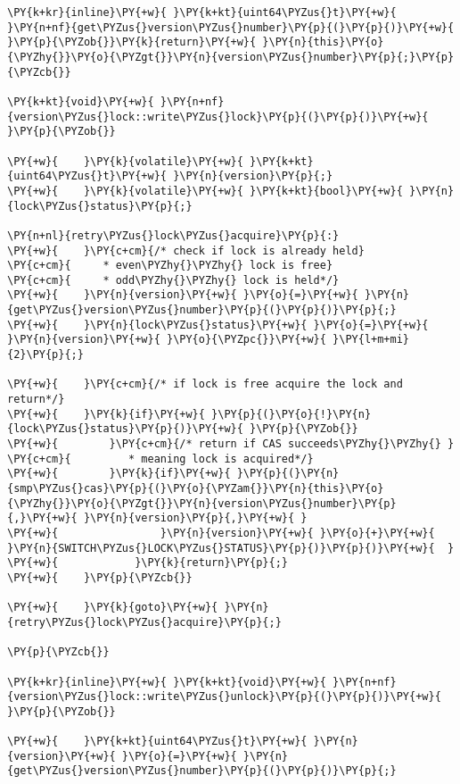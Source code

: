 \begin{Verbatim}[commandchars=\\\{\},codes={\catcode`\$=3\catcode`\^=7\catcode`\_=8\relax}]
\PY{k+kr}{inline}\PY{+w}{ }\PY{k+kt}{uint64\PYZus{}t}\PY{+w}{ }\PY{n+nf}{get\PYZus{}version\PYZus{}number}\PY{p}{(}\PY{p}{)}\PY{+w}{ }\PY{p}{\PYZob{}}\PY{k}{return}\PY{+w}{ }\PY{n}{this}\PY{o}{\PYZhy{}}\PY{o}{\PYZgt{}}\PY{n}{version\PYZus{}number}\PY{p}{;}\PY{p}{\PYZcb{}}

\PY{k+kt}{void}\PY{+w}{ }\PY{n+nf}{version\PYZus{}lock::write\PYZus{}lock}\PY{p}{(}\PY{p}{)}\PY{+w}{ }\PY{p}{\PYZob{}}

\PY{+w}{    }\PY{k}{volatile}\PY{+w}{ }\PY{k+kt}{uint64\PYZus{}t}\PY{+w}{ }\PY{n}{version}\PY{p}{;}
\PY{+w}{    }\PY{k}{volatile}\PY{+w}{ }\PY{k+kt}{bool}\PY{+w}{ }\PY{n}{lock\PYZus{}status}\PY{p}{;}

\PY{n+nl}{retry\PYZus{}lock\PYZus{}acquire}\PY{p}{:}
\PY{+w}{    }\PY{c+cm}{/* check if lock is already held}
\PY{c+cm}{     * even\PYZhy{}\PYZhy{} lock is free}
\PY{c+cm}{     * odd\PYZhy{}\PYZhy{} lock is held*/}
\PY{+w}{    }\PY{n}{version}\PY{+w}{ }\PY{o}{=}\PY{+w}{ }\PY{n}{get\PYZus{}version\PYZus{}number}\PY{p}{(}\PY{p}{)}\PY{p}{;}
\PY{+w}{    }\PY{n}{lock\PYZus{}status}\PY{+w}{ }\PY{o}{=}\PY{+w}{ }\PY{n}{version}\PY{+w}{ }\PY{o}{\PYZpc{}}\PY{+w}{ }\PY{l+m+mi}{2}\PY{p}{;}

\PY{+w}{    }\PY{c+cm}{/* if lock is free acquire the lock and return*/}
\PY{+w}{    }\PY{k}{if}\PY{+w}{ }\PY{p}{(}\PY{o}{!}\PY{n}{lock\PYZus{}status}\PY{p}{)}\PY{+w}{ }\PY{p}{\PYZob{}}
\PY{+w}{        }\PY{c+cm}{/* return if CAS succeeds\PYZhy{}\PYZhy{} }
\PY{c+cm}{         * meaning lock is acquired*/}
\PY{+w}{        }\PY{k}{if}\PY{+w}{ }\PY{p}{(}\PY{n}{smp\PYZus{}cas}\PY{p}{(}\PY{o}{\PYZam{}}\PY{n}{this}\PY{o}{\PYZhy{}}\PY{o}{\PYZgt{}}\PY{n}{version\PYZus{}number}\PY{p}{,}\PY{+w}{ }\PY{n}{version}\PY{p}{,}\PY{+w}{ }
\PY{+w}{                }\PY{n}{version}\PY{+w}{ }\PY{o}{+}\PY{+w}{ }\PY{n}{SWITCH\PYZus{}LOCK\PYZus{}STATUS}\PY{p}{)}\PY{p}{)}\PY{+w}{  }
\PY{+w}{            }\PY{k}{return}\PY{p}{;}
\PY{+w}{    }\PY{p}{\PYZcb{}}

\PY{+w}{    }\PY{k}{goto}\PY{+w}{ }\PY{n}{retry\PYZus{}lock\PYZus{}acquire}\PY{p}{;}

\PY{p}{\PYZcb{}}

\PY{k+kr}{inline}\PY{+w}{ }\PY{k+kt}{void}\PY{+w}{ }\PY{n+nf}{version\PYZus{}lock::write\PYZus{}unlock}\PY{p}{(}\PY{p}{)}\PY{+w}{ }\PY{p}{\PYZob{}}

\PY{+w}{    }\PY{k+kt}{uint64\PYZus{}t}\PY{+w}{ }\PY{n}{version}\PY{+w}{ }\PY{o}{=}\PY{+w}{ }\PY{n}{get\PYZus{}version\PYZus{}number}\PY{p}{(}\PY{p}{)}\PY{p}{;}


\end{Verbatim}
